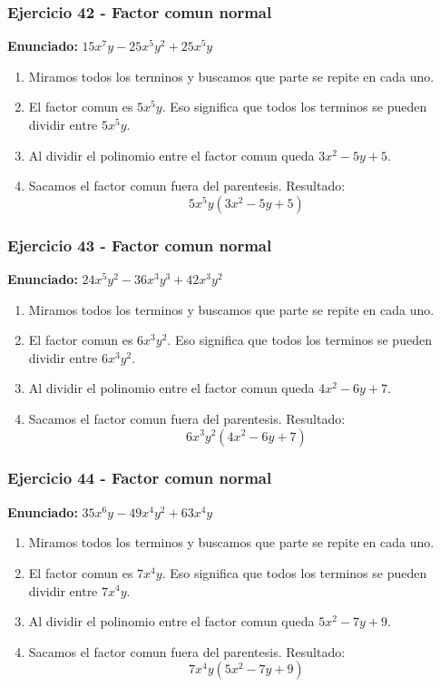 \documentclass[11pt,a4paper]{article}
\begin{document}
\vspace{0.2cm}
\subsubsection*{Ejercicio 42 - Factor comun normal}
\textbf{Enunciado:} $ 15 x^{7} y - 25 x^{5} y^{2} + 25 x^{5} y $\par
\begin{enumerate}[leftmargin=2em]
\item Miramos todos los terminos y buscamos que parte se repite en cada uno.
\item El factor comun es \(5 x^{5} y\). Eso significa que todos los terminos se pueden dividir entre \(5 x^{5} y\).
\item Al dividir el polinomio entre el factor comun queda \(3 x^{2} - 5 y + 5\).
\item Sacamos el factor comun fuera del parentesis. Resultado: \[\boxed{5 x^{5} y\left(3 x^{2} - 5 y + 5\right)}\]
\end{enumerate}

\vspace{0.2cm}
\subsubsection*{Ejercicio 43 - Factor comun normal}
\textbf{Enunciado:} $ 24 x^{5} y^{2} - 36 x^{3} y^{3} + 42 x^{3} y^{2} $\par
\begin{enumerate}[leftmargin=2em]
\item Miramos todos los terminos y buscamos que parte se repite en cada uno.
\item El factor comun es \(6 x^{3} y^{2}\). Eso significa que todos los terminos se pueden dividir entre \(6 x^{3} y^{2}\).
\item Al dividir el polinomio entre el factor comun queda \(4 x^{2} - 6 y + 7\).
\item Sacamos el factor comun fuera del parentesis. Resultado: \[\boxed{6 x^{3} y^{2}\left(4 x^{2} - 6 y + 7\right)}\]
\end{enumerate}

\vspace{0.2cm}
\subsubsection*{Ejercicio 44 - Factor comun normal}
\textbf{Enunciado:} $ 35 x^{6} y - 49 x^{4} y^{2} + 63 x^{4} y $\par
\begin{enumerate}[leftmargin=2em]
\item Miramos todos los terminos y buscamos que parte se repite en cada uno.
\item El factor comun es \(7 x^{4} y\). Eso significa que todos los terminos se pueden dividir entre \(7 x^{4} y\).
\item Al dividir el polinomio entre el factor comun queda \(5 x^{2} - 7 y + 9\).
\item Sacamos el factor comun fuera del parentesis. Resultado: \[\boxed{7 x^{4} y\left(5 x^{2} - 7 y + 9\right)}\]
\end{enumerate}
\end{document}
